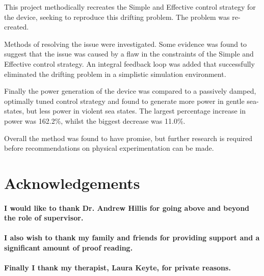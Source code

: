 \documentclass{report}
\begin{document}
This project methodically recreates the Simple and Effective control strategy for the device, seeking to reproduce this drifting problem. The problem was re-created. 

Methods of resolving the issue were investigated. Some evidence was found to suggest that the issue was caused by a flaw in the constraints of the Simple and Effective control strategy. An integral feedback loop was added that successfully eliminated the drifting problem in a simplistic simulation environment.

Finally the power generation of the device was compared to a passively damped, optimally tuned control strategy and found to generate more power in gentle sea-states, but less power in violent sea states. The largest percentage increase in power was 162.2\%, whilst the biggest decrease was 11.0\%.

Overall the method was found to have promise, but further research is required before recommendations on physical experimentation can be made.
\begin{abstract}

\end{abstract}
\section*{Acknowledgements}
\paragraph{I would like to thank Dr. Andrew Hillis for going above and beyond the role of supervisor.} 
\paragraph{I also wish to thank my family and friends for providing support and a significant amount of proof reading.}
\paragraph{Finally I thank my therapist, Laura Keyte, for private reasons.}
\tableofcontents
\listoffigures
\listoftables

\mbox{}

\end{document}
